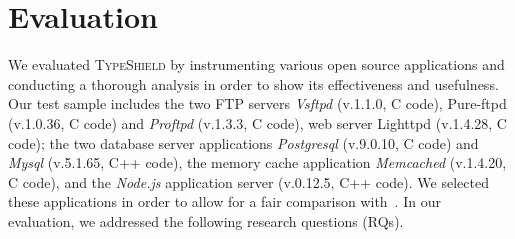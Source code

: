 \section{Evaluation}
\label{chapter:Evaluation}
We evaluated \textsc{TypeShield} by instrumenting various open source applications and 
conducting a thorough analysis in order to show its effectiveness and usefulness. 
Our test sample includes the two 
FTP servers \textit{Vsftpd} (v.1.1.0, C code), Pure-ftpd (v.1.0.36, C code) and 
\textit{Proftpd} (v.1.3.3, C code), 
web server Lighttpd (v.1.4.28, C code); 
the two database server applications 
\textit{Postgresql} (v.9.0.10, C code) and 
\textit{Mysql} (v.5.1.65, C++ code), 
the memory cache application 
\textit{Memcached} (v.1.4.20, C code), and 
the \textit{Node.js} application server (v.0.12.5, C++ code). 
We selected these applications in order to allow for a fair 
comparison with~\cite{veen:typearmor}. 
In our evaluation, we addressed the following research questions (RQs).

